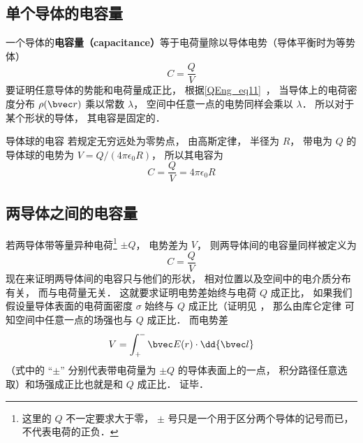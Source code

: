 

\subsection{单个导体的电容量}

一个导体的\textbf{电容量（capacitance）}等于电荷量除以导体电势（导体平衡时为等势体）
\begin{equation}\label{Cpctor_eq2}
C = \frac{Q}{V}
\end{equation}
要证明任意导体的势能和电荷量成正比， 根据\autoref{QEng_eq11}~， 当导体上的电荷密度分布 $\rho(\bvec r)$ 乘以常数 $\lambda$， 空间中任意一点的电势同样会乘以 $\lambda$． 所以对于某个形状的导体， 其电容是固定的．

\begin{example}{导体球的电容}\label{Cpctor_ex1}
若规定无穷远处为零势点， 由高斯定律， 半径为 $R$， 带电为 $Q$ 的导体球的电势为 $V = Q/(4\pi\epsilon_0 R)$， 所以其电容为
\begin{equation}\label{Cpctor_eq1}
C = \frac{Q}{V} = 4\pi\epsilon_0 R
\end{equation}
\end{example}

\subsection{两导体之间的电容量}
若两导体带等量异种电荷\footnote{这里的 $Q$ 不一定要求大于零， $\pm$ 号只是一个用于区分两个导体的记号而已， 不代表电荷的正负．} $\pm Q$， 电势差为 $V$， 则两导体间的电容量同样被定义为
\begin{equation}
C = \frac{Q}{V}
\end{equation}
现在来证明两导体间的电容只与他们的形状， 相对位置以及空间中的电介质分布有关， 而与电荷量无关． 这就要求证明电势差始终与电荷 $Q$ 成正比， 如果我们假设量导体表面的电荷面密度 $\sigma$ 始终与 $Q$ 成正比（证明见%
， 那么由库仑定律%
可知空间中任意一点的场强也与 $Q$ 成正比． 而电势差
\begin{equation}
V = \int_+^- \bvec E(r) \cdot \dd{\bvec l}
\end{equation}
（式中的 “$\pm$” 分别代表带电荷量为 $\pm Q$ 的导体表面上的一点， 积分路径任意选取）和场强成正比也就是和 $Q$ 成正比． 证毕．

